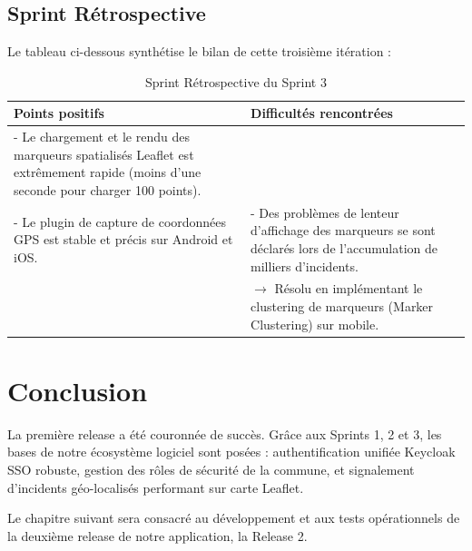 \subsection{Sprint Rétrospective}
Le tableau ci-dessous synthétise le bilan de cette troisième itération :

\begin{table}[H]
    \centering
    \caption{Sprint Rétrospective du Sprint 3}
    \label{tab:retro_sprint3}
    \vspace{0.2cm}
    \small
    \begin{tabularx}{\textwidth}{|X|X|}
        \hline
        \textbf{Points positifs} & \textbf{Difficultés rencontrées} \\ \hline
        - Le chargement et le rendu des marqueurs spatialisés Leaflet est extrêmement rapide (moins d'une seconde pour charger 100 points).\\
        - Le plugin de capture de coordonnées GPS est stable et précis sur Android et iOS. & 
        - Des problèmes de lenteur d'affichage des marqueurs se sont déclarés lors de l'accumulation de milliers d'incidents.\\
        & $\rightarrow$ Résolu en implémentant le clustering de marqueurs (Marker Clustering) sur mobile. \\
        \hline
    \end{tabularx}
\end{table}

\section*{Conclusion}
La première release a été couronnée de succès. Grâce aux Sprints 1, 2 et 3, les bases de notre écosystème logiciel sont posées : authentification unifiée Keycloak SSO robuste, gestion des rôles de sécurité de la commune, et signalement d'incidents géo-localisés performant sur carte Leaflet.

Le chapitre suivant sera consacré au développement et aux tests opérationnels de la deuxième release de notre application, la Release 2.
